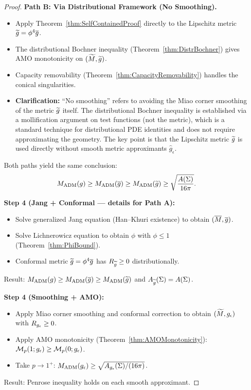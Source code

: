 \begin{proof}
\textbf{Path B: Via Distributional Framework (No Smoothing).}
\begin{itemize}
    \item Apply Theorem~\ref{thm:SelfContainedProof} directly to the Lipschitz metric $\widetilde{g} = \phi^4 \overline{g}$.
    \item The distributional Bochner inequality (Theorem~\ref{thm:DistrBochner}) gives AMO monotonicity on $(\widetilde{M}, \widetilde{g})$.
    \item Capacity removability (Theorem~\ref{thm:CapacityRemovability}) handles the conical singularities.
    \item \textbf{Clarification:} ``No smoothing'' refers to avoiding the Miao corner smoothing of the metric $\widetilde{g}$ itself. The distributional Bochner inequality is established via a mollification argument on test functions (not the metric), which is a standard technique for distributional PDE identities and does not require approximating the geometry. The key point is that the Lipschitz metric $\widetilde{g}$ is used directly without smooth metric approximants $\hat{g}_\epsilon$.
\end{itemize}

Both paths yield the same conclusion:
\begin{equation}
    M_{\mathrm{ADM}}(g) \ge M_{\mathrm{ADM}}(\overline{g}) \ge M_{\mathrm{ADM}}(\widetilde{g}) \ge \sqrt{\frac{A(\Sigma)}{16\pi}}.
\end{equation}

\textbf{Step 4 (Jang + Conformal --- details for Path A):}
\begin{itemize}
    \item Solve generalized Jang equation (Han--Khuri existence) to obtain $(\overline{M}, \overline{g})$.
    \item Solve Lichnerowicz equation to obtain $\phi$ with $\phi \le 1$ (Theorem~\ref{thm:PhiBound}).
    \item Conformal metric $\widetilde{g} = \phi^4 \overline{g}$ has $R_{\widetilde{g}} \ge 0$ distributionally.
\end{itemize}
Result: $M_{\mathrm{ADM}}(g) \ge M_{\mathrm{ADM}}(\overline{g}) \ge M_{\mathrm{ADM}}(\widetilde{g})$ and $A_{\widetilde{g}}(\Sigma) = A(\Sigma)$.

\textbf{Step 4 (Smoothing + AMO):}
\begin{itemize}
    \item Apply Miao corner smoothing and conformal correction to obtain $(\widetilde{M}, g_{\epsilon})$ with $R_{g_{\epsilon}} \ge 0$.
    \item Apply AMO monotonicity (Theorem~\ref{thm:AMOMonotonicity}): $\mathcal{M}_p(1; g_{\epsilon}) \ge \mathcal{M}_p(0; g_{\epsilon})$.
    \item Take $p \to 1^+$: $M_{\mathrm{ADM}}(g_{\epsilon}) \ge \sqrt{A_{g_{\epsilon}}(\Sigma)/(16\pi)}$.
\end{itemize}
Result: Penrose inequality holds on each smooth approximant.


\end{proof}
